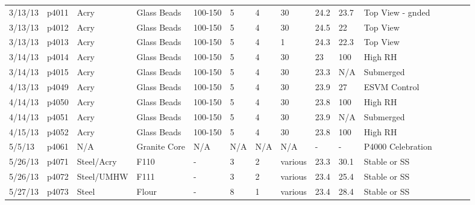 \begin{landscape}
\begin{longtable} {lllllllllllllll}
3/13/13  & p4011      & Acry          & Glass Beads  & 100-150      & 5         & 4             & 30                           & 24.2        & 23.7     & Top View - gnded\\
3/13/13  & p4012      & Acry          & Glass Beads  & 100-150      & 5         & 4             & 30                           & 24.5        & 22       & Top View\\
3/13/13  & p4013      & Acry          & Glass Beads  & 100-150      & 5         & 4             & 1                            & 24.3        & 22.3     & Top View\\
3/14/13  & p4014      & Acry          & Glass Beads  & 100-150      & 5         & 4             & 30                           & 23          & 100      & High RH\\
3/14/13  & p4015      & Acry          & Glass Beads  & 100-150      & 5         & 4             & 30                           & 23.3        & N/A      & Submerged\\
4/13/13  & p4049      & Acry          & Glass Beads  & 100-150      & 5         & 4             & 30                           & 23.9        & 27       & ESVM Control\\
4/14/13  & p4050      & Acry          & Glass Beads  & 100-150      & 5         & 4             & 30                           & 23.8        & 100      & High RH\\
4/14/13  & p4051      & Acry          & Glass Beads  & 100-150      & 5         & 4             & 30                           & 23.9        & N/A      & Submerged\\
4/15/13  & p4052      & Acry          & Glass Beads  & 100-150      & 5         & 4             & 30                           & 23.8        & 100      & High RH\\
5/5/13   & p4061      & N/A              & Granite Core & N/A          & N/A       & N/A           & N/A                          & -           & -        & P4000 Celebration\\
5/26/13  & p4071      & Steel/Acry    & F110         & -            & 3         & 2             & various                      & 23.3        & 30.1     & Stable or SS\\
5/26/13  & p4072      & Steel/UMHW       & F111         & -            & 3         & 2             & various                      & 23.4        & 25.4     & Stable or SS\\
5/27/13  & p4073      & Steel            & Flour        & -            & 8         & 1             & various                      & 23.4        & 28.4     & Stable or SS\\

\end{longtable}
\end{landscape}
